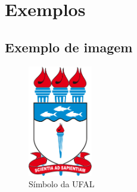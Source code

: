 \chapter{Exemplos}
\label{chap:Exemlos}

\section{Exemplo de imagem}
\label{sec:Exemplo de imagem}
\begin{figure}[!hbt]
	\centering
	\caption{Símbolo da UFAL}
	\label{fig:1_possuem_celular}
	\includegraphics[width=0.25\textwidth]{imagens/ufal}
	
\end{figure}

